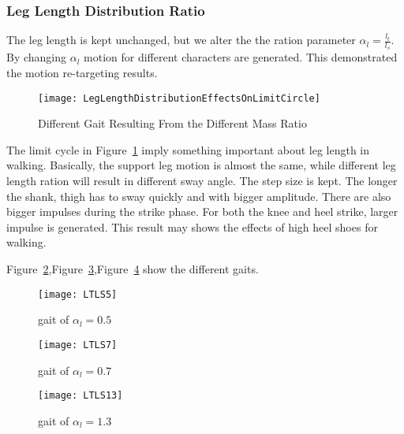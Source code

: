 \subsubsection*{Leg Length Distribution Ratio}
The leg length is kept unchanged, but we alter the the ration parameter $\alpha_l=\frac{l_t}{l_s}$.
By changing $\alpha_l$ motion for different characters are generated.
This demonstrated the motion re-targeting results.


\begin{figure}[!htbp]
  \begin{center}
      \texttt{[image: LegLengthDistributionEffectsOnLimitCircle]}
    \caption{Different Gait Resulting From the Different Mass Ratio}
    \label{fig:differentlr}
\end{center}
\end{figure}

The limit cycle in Figure~\ref{fig:differentlr} imply something important about leg length in walking.
Basically, the support leg motion is almost the same, while different leg length ration will result in different sway angle.
The step size is kept.
The longer the shank, thigh has to sway quickly and with bigger amplitude.
There are also bigger impulses during the strike phase. 
For both the knee and heel strike, larger impulse is generated.
This result may shows the effects of high heel shoes for walking.

Figure~\ref{fig:lr1},Figure~\ref{fig:lr2},Figure~\ref{fig:lr3} show the different gaits.
\begin{figure}[!htbp]
  \begin{center}
      \texttt{[image: LTLS5]}
    \caption{gait of $\alpha_l=0.5$}
    \label{fig:lr1}
\end{center}
\end{figure}

\begin{figure}[!htbp]
  \begin{center}
      \texttt{[image: LTLS7]}
    \caption{gait of $\alpha_l=0.7$}
    \label{fig:lr2}
\end{center}
\end{figure}

\begin{figure}[!htbp]
  \begin{center}
      \texttt{[image: LTLS13]}
    \caption{gait of $\alpha_l=1.3$}
    \label{fig:lr3}
\end{center}
\end{figure}






